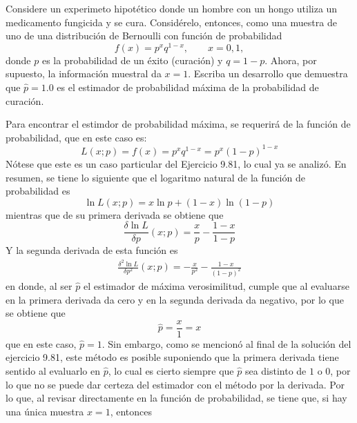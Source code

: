 \begin{enunciado}
 Considere un experimeto hipot\'etico donde un hombre con un hongo utiliza un medicamento fungicida y se cura. Consid\'erelo, entonces, como una muestra de uno de una distribuci\'on de Bernoulli con funci\'on de probabilidad
 \begin{equation*}
  f(x) = p^xq^{1-x}, \qquad x= 0, 1,
 \end{equation*}
 donde $p$ es la probabilidad de un \'exito (curaci\'on) y $q = 1-p$. Ahora, por supuesto, la informaci\'on muestral da $x=1$. Escriba un desarrollo que demuestra que $\hat{p} = 1.0$ es el estimador de probabilidad m\'axima de la probabilidad de curaci\'on.
\end{enunciado}

\begin{solucion}
 Para encontrar el estimdor de probabilidad m\'axima, se requerir\'a de la funci\'on de probabilidad, que en este caso es:
 \begin{equation*}
  L( x; p ) = f(x) = p^{x}q^{1-x} = p^{x}(1-p)^{1-x}
 \end{equation*}
 N\'otese que este es un caso particular del Ejercicio 9.81, lo cual ya se analiz\'o. En resumen, se tiene lo siguiente que el logaritmo natural de la funci\'on de probabilidad es
 \begin{equation*}
  \ln L(x;p) = x\ln p + (1-x)\ln(1-p)
 \end{equation*}
 mientras que de su primera derivada se obtiene que
 \begin{equation*}
  \frac{\delta \ln L}{\delta p} (x;p)  = \frac{x}{p} - \frac{1-x}{1-p}
 \end{equation*}
 Y la segunda derivada de esta funci\'on es
 \begin{eqnarray*}
  \frac{\delta^2 \ln L}{\delta p^2} (x;p) = -\frac{x}{p^2} - \frac{1-x}{(1-p)^2}
 \end{eqnarray*}
 en donde, al ser $\hat{p}$ el estimador de m\'axima verosimilitud, cumple que al evaluarse en la primera derivada da cero y en la segunda derivada da negativo, por lo que se obtiene que 
 \begin{equation*}
  \hat{p} = \frac{x}{1} = x 
 \end{equation*}
 que en este caso, $\hat{p} = 1$. Sin embargo, como se mencion\'o al final de la soluci\'on del ejercicio 9.81, este m\'etodo es posible suponiendo que la primera derivada tiene sentido al evaluarlo en $\hat{p}$, lo cual es cierto siempre que $\hat{p}$ sea distinto de $1$ o $0$, por lo que no se puede dar certeza del estimador con el m\'etodo por la derivada. Por lo que, al revisar directamente en la funci\'on de probabilidad, se tiene que, si hay una \'unica muestra  $x=1$, entonces

\end{solucion}
